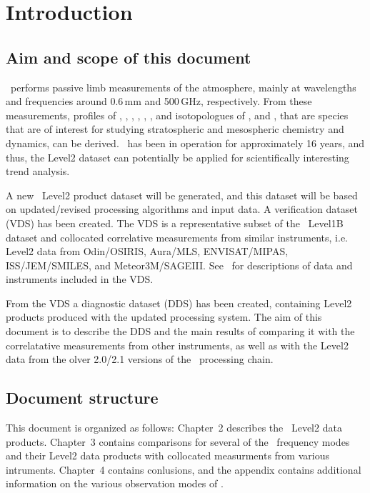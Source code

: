 \chapter{Introduction}
\label{chapter:introduction}


\setcounter{page}{1}


\section{Aim and scope of this document}
\label{sec:aim}
\smr\ performs passive limb measurements of the atmosphere, mainly at
wavelengths and frequencies around 0.6\,mm and 500\,GHz, respectively.  From
these measurements, profiles of , , ,
, , , and isotopologues of ,
and , that are species that are of interest for studying
stratospheric and mesospheric chemistry and dynamics, can be derived.  \smr\
has been in operation for approximately 16 years, and thus, the Level2 dataset
can potentially be applied for scientifically interesting trend analysis.

A new \smr\ Level2 product dataset will be generated, and this dataset will be
based on updated/revised processing algorithms and input data.  A verification
dataset (VDS) has been created. The VDS is a representative subset of the \smr\
Level1B dataset and collocated correlative measurements from similar
instruments, i.e.  Level2 data from Odin/OSIRIS, Aura/MLS, ENVISAT/MIPAS,
ISS/JEM/SMILES, and Meteor3M/SAGEIII. See~\cite{VDS:2016} for descriptions of
data and instruments included in the VDS.

From the VDS a diagnostic dataset (DDS) has been created, containing Level2
products produced with the updated processing system. The aim of this document
is to describe the DDS and the main results of comparing it with the
correlatative measurements from other instruments, as well as with the Level2
data from the olver 2.0/2.1 versions of the \smr\ processing chain.

\section{Document structure}

This document is organized as follows: Chapter~2 describes the \smr\ Level2
data products. Chapter~3 contains comparisons for several of the \smr\
frequency modes and their Level2 data products with collocated measurments from
various intruments. Chapter~4 contains conlusions, and the appendix contains
additional information on the various observation modes of \smr.
